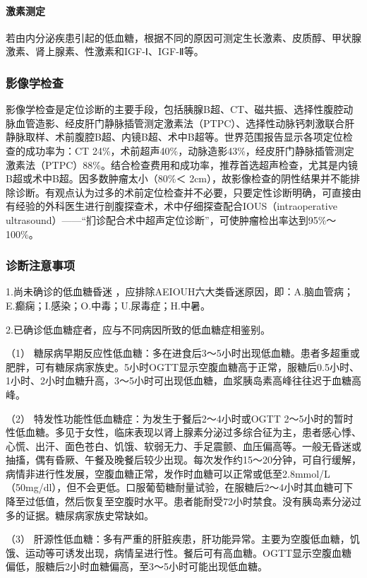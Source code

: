 \paragraph{激素测定}

若由内分泌疾患引起的低血糖，根据不同的原因可测定生长激素、皮质醇、甲状腺激素、肾上腺素、性激素和IGF-Ⅰ、IGF-Ⅱ等。

\subsubsection{影像学检查}

影像学检查是定位诊断的主要手段，包括胰腺B超、CT、磁共振、选择性腹腔动脉血管造影、经皮肝门静脉插管测定激素法（PTPC）、选择性动脉钙刺激联合肝静脉取样、术前腹腔B超、内镜B超、术中B超等。世界范围报告显示各项定位检查的成功率为：CT
24\%，术前超声40\%，动脉造影43\%，经皮肝门静脉插管测定激素法（PTPC）88\%。结合检查费用和成功率，推荐首选超声检查，尤其是内镜B超或术中B超。因多数肿瘤太小（80\%＜
2cm），故影像检查的阴性结果并不能排除诊断。有观点认为过多的术前定位检查并不必要，只要定性诊断明确，可直接由有经验的外科医生进行剖腹探查术，术中仔细探查配合IOUS（intraoperative
ultrasound）------“扪诊配合术中超声定位诊断”，可使肿瘤检出率达到95\%～100\%。

\subsubsection{诊断注意事项}

1.尚未确诊的低血糖昏迷
，应排除AEIOUH六大类昏迷原因，即：A.脑血管病；E.癫痫；I.感染；O.中毒；U.尿毒症；H.中暑。

2.已确诊低血糖症者，应与不同病因所致的低血糖症相鉴别。

（1）
糖尿病早期反应性低血糖：多在进食后3～5小时出现低血糖。患者多超重或肥胖，可有糖尿病家族史。5小时OGTT显示空腹血糖高于正常，服糖后0.5小时、1小时、2小时血糖升高，3～5小时可出现低血糖，血浆胰岛素高峰往往迟于血糖高峰。

（2） 特发性功能性低血糖症：为发生于餐后2～4小时或OGTT
2～5小时的暂时性低血糖。多见于女性，临床表现以肾上腺素分泌过多综合征为主，患者感心悸、心慌、出汗、面色苍白、饥饿、软弱无力、手足震颤、血压偏高等。一般无昏迷或抽搐，偶有昏厥、午餐及晚餐后较少出现。每次发作约15～20分钟，可自行缓解，病情非进行性发展，空腹血糖正常，发作时血糖可以正常或低至2.8mmol/L
（50mg/dl），但不会更低。口服葡萄糖耐量试验，在服糖后2～4小时其血糖可下降至过低值，然后恢复至空腹时水平。患者能耐受72小时禁食。没有胰岛素分泌过多的证据。糖尿病家族史常缺如。

（3）
肝源性低血糖：多有严重的肝脏疾患，肝功能异常。主要为空腹低血糖，饥饿、运动等可诱发出现，病情呈进行性。餐后可有高血糖。OGTT显示空腹血糖偏低，服糖后2小时血糖偏高，至3～5小时可能出现低血糖。

